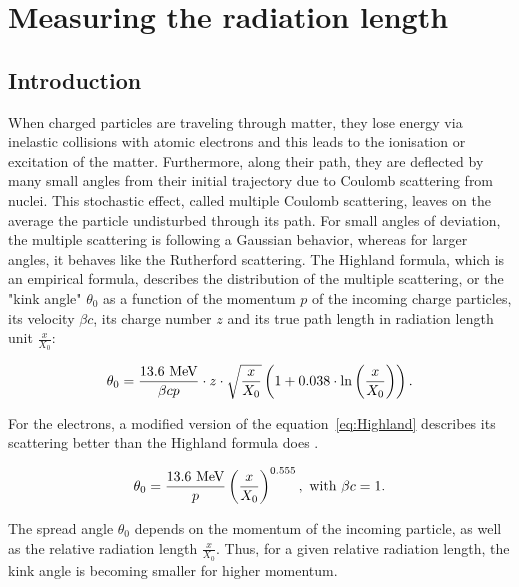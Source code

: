   \section{Measuring the radiation length}

    \subsection{Introduction}
    
    When charged particles are traveling through matter, they lose energy via inelastic collisions with atomic electrons and this leads to the ionisation or excitation of the matter.
    Furthermore, along their path, they are deflected by many small angles from their initial trajectory due to Coulomb scattering from nuclei. 
    This stochastic effect, called multiple Coulomb scattering, leaves on the average the particle undisturbed through its path. 
    For small angles of deviation, the multiple scattering is following a Gaussian behavior, whereas for larger angles, it behaves like the Rutherford scattering.
    The Highland formula, which is an empirical formula, describes the distribution of the multiple scattering, or the "kink angle" $\theta_0$ as a function of the momentum $p$ of the incoming charge particles, its velocity $\beta c$, its charge number $z$ and its true path length in radiation length unit $\frac{x}{X_{0}}$:

    \begin{equation}
      \theta_{0} = \frac{13.6~\rm{MeV}}{\beta c p}\cdot z \cdot \sqrt{\frac{x}{X_{0}}}\left(1 + 0.038 \cdot \ln{\left(\frac{x}{X_{0}}\right)}\right).
      \label{eq:Highland}
    \end{equation}

    For the electrons, a modified version of the equation~\ref{eq:Highland} describes its scattering better than the Highland formula does \cite{GEANT4}.

    \begin{equation}
      \theta_{0} = \frac{13.6~\rm{MeV}}{p}\left(\frac{x}{X_{0}}\right)^{0.555},~\text{with $\beta c = 1$.}
      \label{eq:theta0}
    \end{equation}

    The spread angle $\theta_{0}$ depends on the momentum of the incoming particle, as well as the relative radiation length $\frac{x}{X_{0}}$.
    Thus, for a given relative radiation length, the kink angle is becoming smaller for higher momentum.

